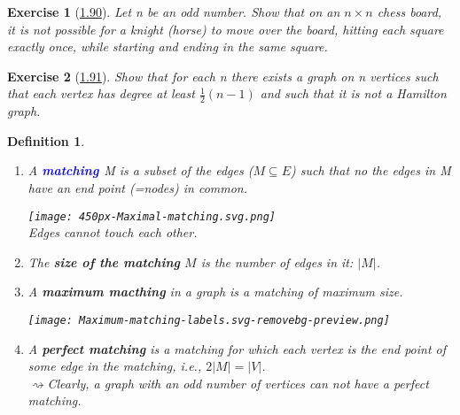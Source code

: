 \documentclass[10pt]{report}
\numberwithin{dummy}{section}
\theoremstyle{ocrenumbox}
\newtheorem{definitionT}{Exercise}[]
\theoremstyle{grayman}
\newtheorem{definitionTTTT}{Definition}[]
\newenvironment{exo}{\begin{dBox}\begin{definitionT}}{\end{definitionT}\end{dBox}}
\newenvironment{voc}{\begin{vBox}\begin{definitionTTTT}}{\end{definitionTTTT}\end{vBox}}
\begin{document}
\begin{exo}[\hypertarget{exo190}{\hyperlink{so190}{1.90}}] 
Let n be an odd number. Show that on an $n \times n$ chess board,
it is not possible for a knight (horse) to move over the board, hitting each
square exactly once, while starting and ending in the same square.
\end{exo}
\begin{exo}[\hypertarget{exo191}{\hyperlink{so191}{1.91}}] 
Show that for each n there exists a graph on n vertices
such that each vertex has degree at least $\frac{1}{2}(n-1)$ and such that it is not a Hamilton graph.
\end{exo}
\begin{voc}{}{}\leavevmode
\begin{enumerate}
    \item A \textbf{\textcolor{blue}{matching }} M is a subset of the edges ($M \subseteq E$) such that no the edges
    in M have an end point (=nodes) in common. 
    \begin{center}
    \texttt{[image: 450px-Maximal-matching.svg.png]}\\
    Edges cannot touch each other.
    \end{center}
    
    \item The \textbf{size of the matching} $M$ is the number of edges in it: $\lvert M\rvert$. 
    \item A \textbf{maximum macthing} in a graph is a matching of maximum size. 
    \begin{center}
    \texttt{[image: Maximum-matching-labels.svg-removebg-preview.png]}
    \end{center}
    \item A \textbf{perfect matching} is a matching for which each vertex is the end point of some edge in the matching, i.e., $2\lvert M\rvert = \lvert V \rvert $. \\
    $\rightsquigarrow$Clearly, a graph with an odd number of vertices can not have a perfect matching.
\end{enumerate}
\end{voc}
\end{document}
